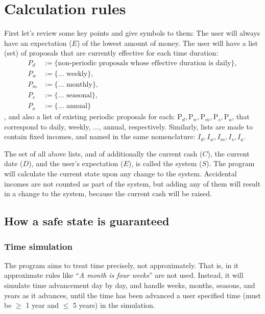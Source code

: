 \section{Calculation rules} \label{sec:cal.rule}
First let's review some key points and give symbols to them: The user will always have an expectation ($E$) of the lowest amount of money. The user will have a list (set) of proposals that are currently effective for each time duration:
\begin{align*}
P_d &:= \{\text{non-periodic proposals whose effective duration is daily} \}, 
\\P_w &:= \{\text{... weekly}\}, 
\\P_m &:= \{\text{... monthly}\}, 
\\P_s &:= \{\text{... seasonal}\}, 
\\P_a &:= \{\text{... annual}\}
\end{align*},
and also a list of existing periodic proposals for each: $\mathrm{P}_d, \mathrm{P}_w, \mathrm{P}_m, \mathrm{P}_s, \mathrm{P}_a$, that correspond to daily, weekly, ..., annual, respectively. Similarly, lists are made to contain fixed incomes, and named in the same nomenclature: $I_d, I_w, I_m, I_s, I_a$.

The set of all above lists, and of additionally the current cash ($C$), the current date ($D$), and the user's expectation ($E$), is called the system ($S$). The program will calculate the current state upon any change to the system. Accidental incomes are not counted as part of the system, but adding any of them will result in a change to the system, because the current cash will be raised.

\subsection{How a safe state is guaranteed}
\subsubsection{Time simulation} \label{subsubsec:cal:state.cal:time.sim}
The program aims to treat time precisely, not approximately. That is, in it approximate rules like ``\emph{A month is four weeks}'' are not used. Instead, it will simulate time advancement day by day, and handle weeks, months, seasons, and years as it advances, until the time has been advanced a user specified time (must be $\ge$ 1 year and $\le$ 5 years) in the simulation.

